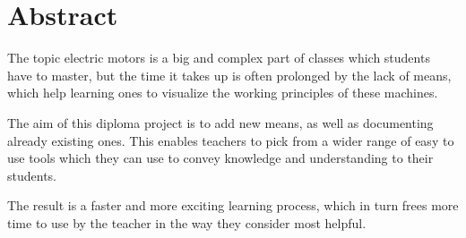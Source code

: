 \section*{Abstract}

The topic electric motors is a big and complex part of classes which students have to master, but the time it takes up is often prolonged by the lack of means, which help learning ones to visualize the working principles of these machines.

The aim of this diploma project is to add new means, as well as documenting already existing ones. This enables teachers to pick from a wider range of easy to use tools which they can use to convey knowledge and understanding to their students.

The result is a faster and more exciting learning process, which in turn frees more time to use by the teacher in the way they consider most helpful.
\newpage